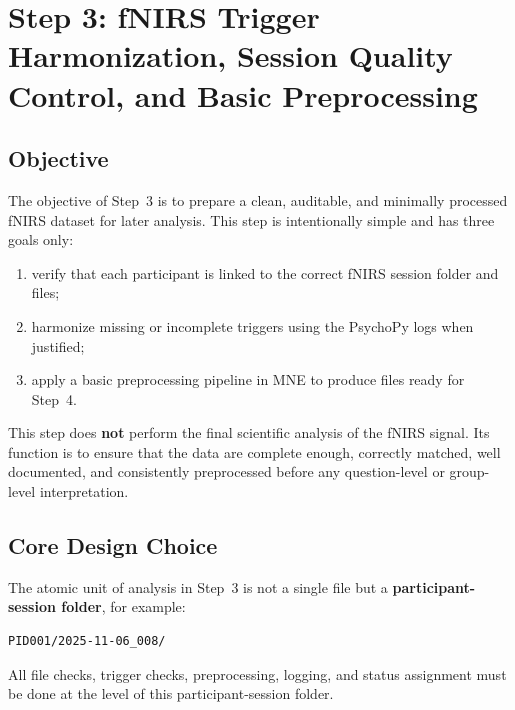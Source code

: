 \documentclass[11pt]{article}
\begin{document}
\sloppy
\section{Step 3: fNIRS Trigger Harmonization, Session Quality Control, and Basic Preprocessing}
\label{sec:step3_fnirs}

\subsection{Objective}
The objective of Step~3 is to prepare a clean, auditable, and minimally processed fNIRS dataset
for later analysis.
This step is intentionally simple and has three goals only:
\begin{enumerate}
    \item verify that each participant is linked to the correct fNIRS session folder and files;
    \item harmonize missing or incomplete triggers using the PsychoPy logs when justified;
    \item apply a basic preprocessing pipeline in MNE to produce files ready for Step~4.
\end{enumerate}

This step does \textbf{not} perform the final scientific analysis of the fNIRS signal.
Its function is to ensure that the data are complete enough, correctly matched, well documented,
and consistently preprocessed before any question-level or group-level interpretation.

\subsection{Core Design Choice}
The atomic unit of analysis in Step~3 is not a single file but a
\textbf{participant-session folder}, for example:
\begin{verbatim}
PID001/2025-11-06_008/
\end{verbatim}

All file checks, trigger checks, preprocessing, logging, and status assignment must be done
at the level of this participant-session folder.
\end{document}
